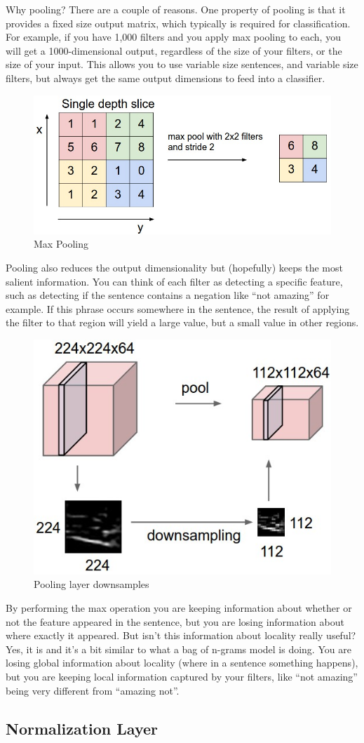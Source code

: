 \documentclass{article}
\begin{document}
Why pooling? There are a couple of reasons. One property of pooling is that it provides a fixed size output matrix, which typically is required for classification. For example, if you have 1,000 filters and you apply max pooling to each, you will get a 1000-dimensional output, regardless of the size of your filters, or the size of your input. This allows you to use variable size sentences, and variable size filters, but always get the same output dimensions to feed into a classifier.

\begin{figure}[H]
\centering
\includegraphics[width=.4\textwidth]{maxpool.jpeg}
\caption{Max Pooling}
\end{figure}

Pooling also reduces the output dimensionality but (hopefully) keeps the most salient information. You can think of each filter as detecting a specific feature, such as detecting if the sentence contains a negation like “not amazing” for example. If this phrase occurs somewhere in the sentence, the result of applying the filter to that region will yield a large value, but a small value in other regions. 

\begin{figure}[H]
\centering
\includegraphics[width=.2\textwidth]{pool.jpeg}
\caption{Pooling layer downsamples}
\end{figure}

By performing the max operation you  are keeping information about whether or not the feature appeared in the sentence, but you are losing information about where exactly it appeared. But isn’t this information about locality really useful? Yes, it  is and it’s a bit similar to what a bag of n-grams model is doing. You are losing global information about locality (where in a sentence something happens), but you are keeping local information captured by your filters, like “not amazing” being very different from “amazing not”.

\subsection{Normalization Layer}
\end{document}
